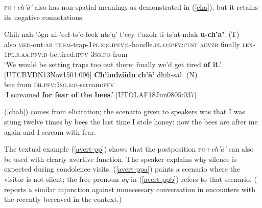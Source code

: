 \documentclass[output=paper,colorlinks,citecolor=brown]{langscibook}
\begin{document}
\textsc{po}+\textit{ch'à'} also has non-spatial meanings as demonstrated in (\ref{cha}), but it retains its negative connotations. 

\begin{exe}
\ex 
\label{cha}
\begin{xlista}
\ex \label{chaa}
\gll Chih nah-'ógn ni-'eeł-ts'e-łeek {nts'ą' t'eey} t'axoh ti-ts'at-ndak {\textbf{u-ch'a'}. \textnormal{(T)}} \\
also \textsc{med}-out:\textsc{ar} \textsc{term}-trap-\textsc{1pl.s:ø.ipfv:l}-handle.\textsc{pl.o:ipfv:cust} \textsc{advzr} finally \textsc{lex-1pl.s:aa.pfv:d}-be.tired:\textsc{ipfv} \textsc{3sg.po}-from \\
\glt `We would be setting traps too out there; finally we'd get tired \textbf{of it}.' \\ \hfill [UTCBVDN13Nov1501:096]
\ex \label{chab}
\gll \textbf{Ch'indziidn} \textbf{ch'à'} {dhih-säł. \textnormal{(N)}} \\
bee from \textsc{dh.pfv:1sg.s:ø}-scream:\textsc{pfv} \\
\glt `I screamed \textbf{for fear of the bees}.' \hfill [UTOLAF18Jun0805:037]
\end{xlista}
\end{exe}

\noindent (\ref{chab}) comes from elicitation; the scenario given to speakers was that I was stung twelve times by bees the last time I stole honey: now the bees are after me again and I scream with fear.

The textual example (\ref{avert-pp}) shows that the postposition \textsc{po}+\textit{ch'à'} can also be used with clearly avertive function. The speaker explains why silence is expected during condolence visits. (\ref{avert-ppa}) paints a scenario where the visitor is not silent; the free pronoun \textit{ay} in (\ref{avert-ppb}) refers to that scenario. (\citet[90–92]{BassoK1990} reports a similar injunction against unnecessary conversation in encounters with the recently bereaved in the  context.)
\end{document}
